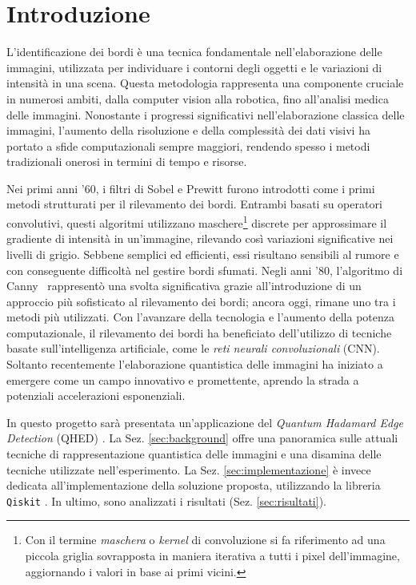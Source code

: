 \section{Introduzione}

L'identificazione dei bordi è una tecnica fondamentale nell'elaborazione delle
immagini, utilizzata per individuare i contorni degli oggetti e le variazioni di
intensità in una scena. Questa metodologia rappresenta una componente cruciale
in numerosi ambiti, dalla computer vision alla robotica, fino all'analisi medica
delle immagini. Nonostante i progressi significativi nell'elaborazione classica
delle immagini, l'aumento della risoluzione e della complessità dei dati visivi
ha portato a sfide computazionali sempre maggiori, rendendo spesso i metodi
tradizionali onerosi in termini di tempo e risorse.

Nei primi anni '60, i filtri di Sobel \cite{SobelFeldman1968IsotropicGradient} e
Prewitt furono introdotti come i primi metodi strutturati per il rilevamento dei
bordi. Entrambi basati su operatori convolutivi, questi algoritmi utilizzano
maschere\footnote{Con il termine \textit{maschera} o \textit{kernel} di convoluzione 
si fa riferimento ad una piccola griglia sovrapposta in maniera iterativa a tutti i pixel
dell'immagine, aggiornando i valori in base ai primi vicini.} discrete per approssimare 
il gradiente di intensità in un'immagine,
rilevando così variazioni significative nei livelli di grigio. Sebbene semplici
ed efficienti, essi risultano sensibili al rumore e con conseguente difficoltà
nel gestire bordi sfumati. Negli anni '80, l'algoritmo di
Canny~\cite{CannyPaper} rappresentò una svolta significativa grazie
all'introduzione di un approccio più sofisticato al rilevamento dei bordi;
ancora oggi, rimane uno tra i metodi più utilizzati. Con l'avanzare della
tecnologia e l'aumento della potenza computazionale, il rilevamento dei bordi ha
beneficiato dell'utilizzo di tecniche basate sull'intelligenza artificiale, come
le \emph{reti neurali convoluzionali} (CNN). Soltanto recentemente
l'elaborazione quantistica delle immagini ha iniziato a emergere come un campo
innovativo e promettente, aprendo la strada a potenziali accelerazioni
esponenziali.

In questo progetto sarà presentata un'applicazione del \emph{Quantum Hadamard
Edge Detection} (QHED) \cite{Yao_2017}. La Sez. \ref{sec:background}
offre una panoramica sulle attuali tecniche di
rappresentazione quantistica delle immagini e una disamina delle tecniche
utilizzate nell'esperimento. La Sez. \ref{sec:implementazione}
è invece dedicata all'implementazione della soluzione proposta,
utilizzando la libreria \texttt{Qiskit} \cite{Qiskit}. In ultimo, sono
analizzati i risultati (Sez. \ref{sec:risultati}).
